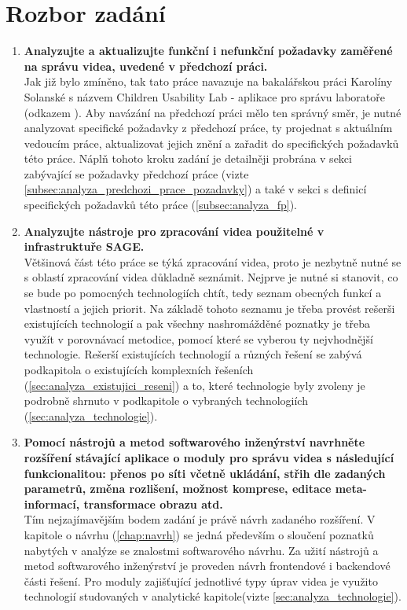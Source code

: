 \documentclass[thesis=M,czech]{FITthesis}[2012/06/26]
\begin{document}
\section{Rozbor zadání} \label{sec:analyza_rozbor_zadani}
\begin{enumerate}
	\item \textbf{Analyzujte a aktualizujte funkční i nefunkční požadavky zaměřené na správu videa, uvedené v předchozí
práci.\\}
	Jak již bylo zmíněno, tak tato práce navazuje na bakalářskou práci Karolíny Solanské s názvem Children Usability Lab - aplikace pro správu laboratoře (odkazem \cite{solankar}). Aby navázání na předchozí práci mělo ten správný směr, je nutné analyzovat specifické požadavky z předchozí práce, ty projednat s aktuálním vedoucím práce, aktualizovat jejich znění a zařadit do specifických požadavků této práce. Náplň tohoto kroku zadání je detailněji probrána v sekci zabývající se požadavky předchozí práce (vizte \ref{subsec:analyza_predchozi_prace_pozadavky}) a také v sekci s definicí specifických požadavků této práce (\ref{subsec:analyza_fp}).
	\item \textbf{Analyzujte nástroje pro zpracování videa použitelné v infrastruktuře SAGE.\\}
	Většinová část této práce se týká zpracování videa, proto je nezbytně nutné se s oblastí zpracování videa důkladně seznámit. 
	Nejprve je nutné si stanovit, co se bude po pomocných technologiích chtít, tedy seznam obecných funkcí a vlastností a jejich priorit. Na základě tohoto seznamu je třeba provést rešerši existujících technologií a pak všechny nashromážděné poznatky je třeba využít v porovnávací metodice, pomocí které se vyberou ty nejvhodnější technologie. Rešerší existujících technologií a různých řešení se zabývá podkapitola o existujících komplexních řešeních (\ref{sec:analyza_existujici_reseni}) a to, které technologie byly zvoleny je podrobně shrnuto v podkapitole o vybraných technologiích (\ref{sec:analyza_technologie}).
	\item \textbf{Pomocí nástrojů a metod softwarového inženýrství navrhněte rozšíření stávající aplikace o moduly pro
správu videa s následující funkcionalitou: přenos po síti včetně ukládání, střih dle zadaných parametrů,
změna rozlišení, možnost komprese, editace meta-informací, transformace obrazu atd.\\}
	Tím nejzajímavějším bodem zadání je právě návrh zadaného rozšíření. V kapitole o návrhu (\ref{chap:navrh}) se jedná především o sloučení poznatků nabytých v analýze se znalostmi softwarového návrhu. Za užití nástrojů a metod softwarového inženýrství je proveden návrh frontendové i backendové části řešení. Pro moduly zajišťující jednotlivé typy úprav videa je využito technologií studovaných v analytické kapitole(vizte \ref{sec:analyza_technologie}).  

\end{enumerate}
\end{document}
